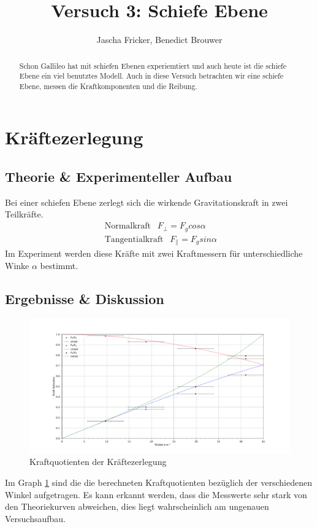 \documentclass[11pt, a4paper]{article}
\title{Versuch 3: Schiefe Ebene}
\author{Jascha Fricker, Benedict Brouwer}
\begin{document}
    \maketitle

    

    \begin{abstract}
        Schon Gallileo hat mit schiefen Ebenen experiemtiert und auch heute ist die schiefe Ebene ein viel benutztes
        Modell. Auch in diese Versuch betrachten wir eine schiefe Ebene, messen die Kraftkomponenten und
        die Reibung. 
    \end{abstract}

    \tableofcontents

    \newpage

    \section{Kräftezerlegung}
    \subsection{Theorie \& Experimenteller Aufbau}
    Bei einer schiefen Ebene zerlegt sich die wirkende Gravitationskraft in zwei Teilkräfte.
    \begin{align}
        \text{ Normalkraft } \ \ F_\perp = F_g cos \alpha \\
        \text{ Tangentialkraft } \ \ F_\parallel = F_g sin \alpha 
    \end{align}
    Im Experiment werden diese Kräfte mit zwei Kraftmessern für unterschiedliche Winke $\alpha$ bestimmt.

    \subsection{Ergebnisse \& Diskussion}
    \begin{figure}
        \centering
        \includegraphics[width=\textwidth]{./5Kraftzer.pdf}

        \caption{Kraftquotienten der Kräftezerlegung}
        \label{fig:Kraftzer}
    \end{figure}
    Im Graph \ref{fig:Kraftzer} sind die die berechneten Kraftquotienten bezüglich der verschiedenen Winkel aufgetragen.
    Es kann erkannt werden, dass die Messwerte sehr stark von den Theoriekurven abweichen, dies liegt wahrscheinlich
    am ungenauen Versuchsaufbau.
    
\end{document}
